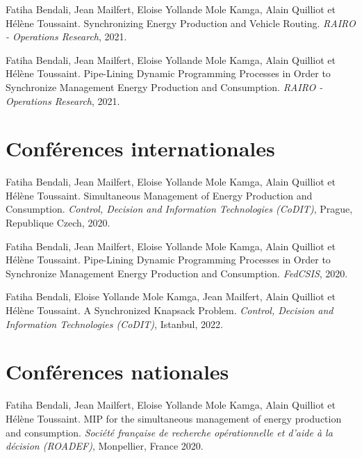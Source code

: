 \documentclass[11pt,a4paper]{report}
\begin{document}
Fatiha Bendali, Jean Mailfert, Eloise Yollande Mole Kamga, Alain Quilliot et Hélène Toussaint.
\newblock Synchronizing Energy Production and Vehicle Routing.
\newblock \textit{RAIRO - Operations Research}, 2021.%

Fatiha Bendali, Jean Mailfert, Eloise Yollande Mole Kamga, Alain Quilliot et Hélène Toussaint.
\newblock Pipe-Lining Dynamic Programming Processes in Order to Synchronize Management Energy Production and Consumption.
\newblock \textit{RAIRO - Operations Research}, 2021.%

\section*{Conférences internationales}

Fatiha Bendali, Jean Mailfert, Eloise Yollande Mole Kamga, Alain Quilliot et Hélène Toussaint.
\newblock Simultaneous Management of Energy Production and Consumption.
\newblock \textit{Control, Decision and Information Technologies (CoDIT)}, Prague, Republique Czech, 2020.


Fatiha Bendali, Jean Mailfert, Eloise Yollande Mole Kamga, Alain Quilliot et Hélène Toussaint.
\newblock Pipe-Lining Dynamic Programming Processes in Order to Synchronize Management Energy Production and Consumption.
\newblock \textit{FedCSIS}, 2020.	


Fatiha Bendali, Eloise Yollande Mole Kamga, Jean Mailfert, Alain Quilliot et Hélène Toussaint.
\newblock A Synchronized Knapsack Problem.
\newblock \textit{Control, Decision and Information Technologies (CoDIT)}, Istanbul, 2022. 

\section*{Conférences nationales}
Fatiha Bendali, Jean Mailfert, Eloise Yollande Mole Kamga, Alain Quilliot et Hélène Toussaint.
\newblock MIP for the simultaneous management of energy production and consumption.
\newblock \textit{Société française de recherche opérationnelle et d'aide à la décision (ROADEF)}, Monpellier, France 2020.
\end{document}
